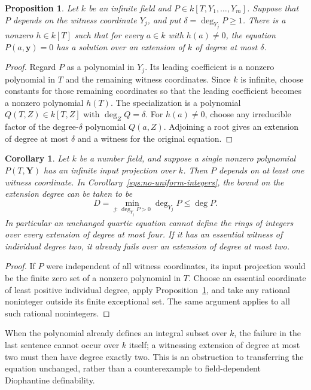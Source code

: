 \documentclass[11pt,a4paper]{article}
\newtheorem{proposition}[theorem]{Proposition}
\newtheorem{corollary}[theorem]{Corollary}
\theoremstyle{definition}\newtheorem{definition}[theorem]{Definition}
\theoremstyle{remark}\newtheorem{remark}[theorem]{Remark}
\begin{document}
\begin{proposition}\label{sys:hypersurface-extension-bound}
Let $k$ be an infinite field and
$P\in k[T,Y_1,\ldots,Y_m]$. Suppose that $P$ depends on the
witness coordinate $Y_j$, and put $\delta=\deg_{Y_j}P\ge1$.
There is a nonzero $h\in k[T]$ such that for every $a\in k$
with $h(a)\ne0$, the equation $P(a,\mathbf y)=0$ has a solution
over an extension of $k$ of degree at most $\delta$.
\end{proposition}
\begin{proof}
Regard $P$ as a polynomial in $Y_j$. Its leading coefficient
is a nonzero polynomial in $T$ and the remaining witness
coordinates. Since $k$ is infinite, choose constants for those
remaining coordinates so that the leading coefficient becomes
a nonzero polynomial $h(T)$. The specialization is a polynomial
$Q(T,Z)\in k[T,Z]$ with $\deg_ZQ=\delta$. For $h(a)\ne0$,
choose any irreducible factor of the degree-$\delta$ polynomial
$Q(a,Z)$. Adjoining a root gives an extension of degree at
most $\delta$ and a witness for the original equation.
\end{proof}

\begin{corollary}\label{sys:single-polynomial-extension}
Let $k$ be a number field, and suppose a single nonzero polynomial
$P(T,\mathbf Y)$ has an infinite input projection over $k$.
Then $P$ depends on at least one witness coordinate. In
Corollary~\ref{sys:no-uniform-integers}, the bound on the extension
degree can be taken to be
\[
            D=\min_{j:\,\deg_{Y_j}P>0}\deg_{Y_j}P
               \le \deg P.
\]
In particular an unchanged quartic equation cannot define the
rings of integers over every extension of degree at most four.
If it has an essential witness of individual degree two, it
already fails over an extension of degree at most two.
\end{corollary}
\begin{proof}
If $P$ were independent of all witness coordinates, its input
projection would be the finite zero set of a nonzero polynomial
in $T$. Choose an essential coordinate of least positive
individual degree, apply Proposition~\ref{sys:hypersurface-extension-bound},
and take any rational noninteger outside its finite exceptional
set. The same argument applies to all such rational nonintegers.
\end{proof}

When the polynomial already defines an integral subset over
$k$, the failure in the last sentence cannot occur over $k$
itself; a witnessing extension of degree at most two must then
have degree exactly two. This is an obstruction to transferring
the equation unchanged, rather than a counterexample to
field-dependent Diophantine definability.
\end{document}
